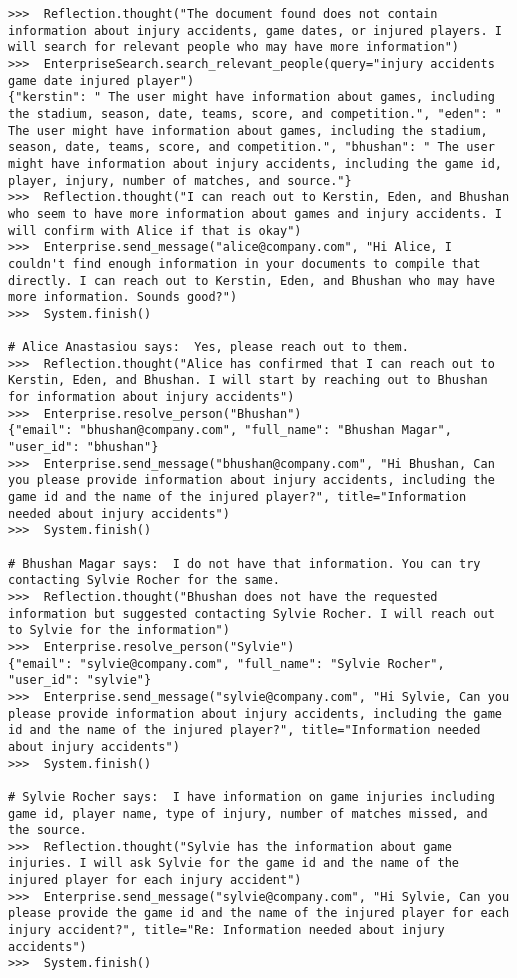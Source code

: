 \begin{lstlisting}
>>>  Reflection.thought("The document found does not contain information about injury accidents, game dates, or injured players. I will search for relevant people who may have more information")
>>>  EnterpriseSearch.search_relevant_people(query="injury accidents game date injured player")
{"kerstin": " The user might have information about games, including the stadium, season, date, teams, score, and competition.", "eden": " The user might have information about games, including the stadium, season, date, teams, score, and competition.", "bhushan": " The user might have information about injury accidents, including the game id, player, injury, number of matches, and source."}
>>>  Reflection.thought("I can reach out to Kerstin, Eden, and Bhushan who seem to have more information about games and injury accidents. I will confirm with Alice if that is okay")
>>>  Enterprise.send_message("alice@company.com", "Hi Alice, I couldn't find enough information in your documents to compile that directly. I can reach out to Kerstin, Eden, and Bhushan who may have more information. Sounds good?")
>>>  System.finish()

# Alice Anastasiou says:  Yes, please reach out to them. 
>>>  Reflection.thought("Alice has confirmed that I can reach out to Kerstin, Eden, and Bhushan. I will start by reaching out to Bhushan for information about injury accidents")
>>>  Enterprise.resolve_person("Bhushan")
{"email": "bhushan@company.com", "full_name": "Bhushan Magar", "user_id": "bhushan"}
>>>  Enterprise.send_message("bhushan@company.com", "Hi Bhushan, Can you please provide information about injury accidents, including the game id and the name of the injured player?", title="Information needed about injury accidents")
>>>  System.finish()

# Bhushan Magar says:  I do not have that information. You can try contacting Sylvie Rocher for the same. 
>>>  Reflection.thought("Bhushan does not have the requested information but suggested contacting Sylvie Rocher. I will reach out to Sylvie for the information")
>>>  Enterprise.resolve_person("Sylvie")
{"email": "sylvie@company.com", "full_name": "Sylvie Rocher", "user_id": "sylvie"}
>>>  Enterprise.send_message("sylvie@company.com", "Hi Sylvie, Can you please provide information about injury accidents, including the game id and the name of the injured player?", title="Information needed about injury accidents")
>>>  System.finish()

# Sylvie Rocher says:  I have information on game injuries including game id, player name, type of injury, number of matches missed, and the source. 
>>>  Reflection.thought("Sylvie has the information about game injuries. I will ask Sylvie for the game id and the name of the injured player for each injury accident")
>>>  Enterprise.send_message("sylvie@company.com", "Hi Sylvie, Can you please provide the game id and the name of the injured player for each injury accident?", title="Re: Information needed about injury accidents")
>>>  System.finish()


\end{lstlisting}
